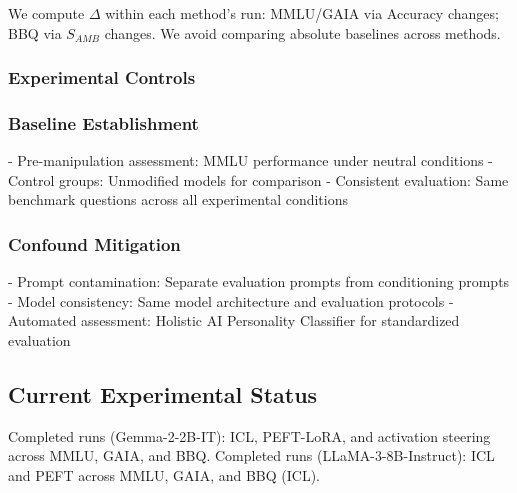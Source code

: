 We compute \(\Delta\) within each method's run: MMLU/GAIA via Accuracy changes; BBQ via \(S_{AMB}\) changes. We avoid comparing absolute baselines across methods.

\subsubsection{Experimental Controls}

\subsubsection{Baseline Establishment}
- Pre-manipulation assessment: MMLU performance under neutral conditions
- Control groups: Unmodified models for comparison
- Consistent evaluation: Same benchmark questions across all experimental conditions

\subsubsection{Confound Mitigation}
- Prompt contamination: Separate evaluation prompts from conditioning prompts
- Model consistency: Same model architecture and evaluation protocols
- Automated assessment: Holistic AI Personality Classifier for standardized evaluation

\subsection{Current Experimental Status}

Completed runs (Gemma-2-2B-IT): ICL, PEFT-LoRA, and activation steering across MMLU, GAIA, and BBQ. Completed runs (LLaMA-3-8B-Instruct): ICL and PEFT across MMLU, GAIA, and BBQ (ICL).
